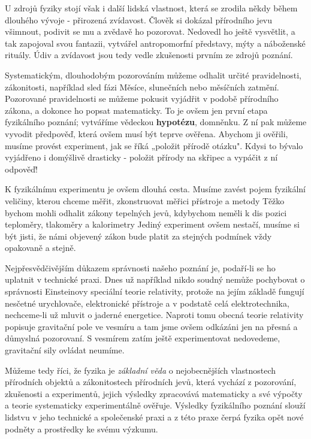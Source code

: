       U zdrojů fyziky stojí však i další lidská vlastnost, která se zrodila někdy během dlouhého
      vývoje - přirozená zvídavost. Člověk si dokázal přírodního jevu všimnout, podivit se mu a
      zvědavě ho pozorovat. Nedovedl ho ještě vysvětlit, a tak zapojoval svou fantazii, vytvářel
      antropomorfní představy, mýty a náboženské rituály. Údiv a zvídavost jsou tedy vedle
      zkušenosti prvním ze zdrojů poznání. 

      Systematickým, dlouhodobým pozorováním můžeme odhalit určité pravidelnosti, zákonitosti,
      například sled fázi Měsíce, slunečních nebo měsíčních zatmění. Pozorované pravidelnosti se
      můžeme pokusit vyjádřit v podobě přírodního zákona, a dokonce ho popsat matematicky. To je
      ovšem jen první etapa fyzikálního poznání; vytváříme vědeckou \textbf{hypotézu}, domněnku. Z
      ní pak můžeme vyvodit předpověď, která ovšem musí být teprve ověřena. Abychom ji ověřili,
      musíme provést experiment, jak se říká „položit přírodě otázku". Kdysi to bývalo vyjádřeno i
      domýšlivě drasticky - položit přírody na skřipec a vypáčit z ní odpověď! 

      K fyzikálnímu experimentu je ovšem dlouhá cesta. Musíme zavést pojem fyzikální veličiny,
      kterou chceme měřit, zkonstruovat měřici přístroje a metody Těžko bychom mohli odhalit zákony
      tepelných jevů, kdybychom neměli k dis pozici teploměry, tlakoměry a kalorimetry Jediný
      experiment ovšem nestačí, musíme si být jisti, že námi objevený zákon bude platit za stejných
      podmínek vždy opakovaně a stejně. 

      Nejpřesvědčivějším důkazem správnosti našeho poznání je, podaří-li se ho uplatnit v technické
      praxi. Dnes už například nikdo soudný nemůže pochybovat o správnosti Einsteinovy speciální
      teorie relativity, protože na jejím základě fungují nesčetné urychlovače, elektronické
      přístroje a v podstatě celá elektrotechnika, nechceme-li už mluvit o jaderné energetice.
      Naproti tomu obecná teorie relativity popisuje gravitační pole ve vesmíru a tam jsme ovšem
      odkázáni jen na přesná a důmyslná pozorovaní. S vesmírem zatím ještě experimentovat
      nedovedeme, gravitační sily ovládat neumíme.

      \begin{tcnote}
        Můžeme tedy říci, že fyzika je \emph{základní věda} o nejobecnějších vlastnostech přírodních
        objektů a zákonitostech přírodních jevů, která vychází z pozorování, zkušenosti a
        experimentů, jejich výsledky zpracovává matematicky a své výpočty a teorie systematicky
        experimentálně ověřuje. Výsledky fyzikálního poznání slouží lidstvu v jeho technické a
        společenské praxi a z této praxe čerpá fyzika opět nové podněty a prostředky ke svému
        výzkumu. \cite[s.~16]{Stoll2009} 
      \end{tcnote}
    
